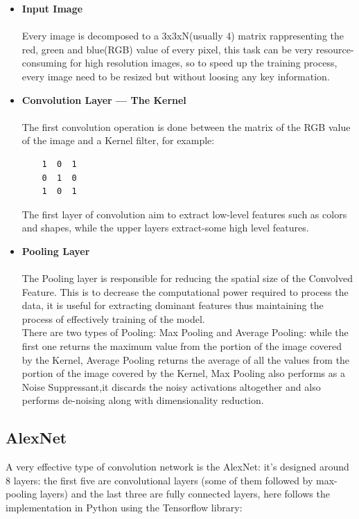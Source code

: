 \documentclass{article}
\begin{document}
\begin{itemize}
 \item \textbf{Input Image}\\\\
 	Every image is decomposed to a 3x3xN(usually 4) matrix rappresenting the red, green and blue(RGB) value of every pixel, this task can be very resource-consuming for high resolution images, so to speed up the training process, every image need to be resized but without loosing any key information.
	
	\item \textbf{Convolution Layer — The Kernel}\\\\
	The first convolution operation is done between the matrix of the RGB value of the image and a Kernel filter, for example:
	
	\begin{verbatim}
	1  0  1
	0  1  0
	1  0  1
	\end{verbatim}
	
	The first layer of convolution aim to extract low-level features such as colors and shapes, while the upper layers extract-some high level features.
	
	\item \textbf{Pooling Layer}\\\\
	The Pooling layer is responsible for reducing the spatial size of the Convolved Feature. This is to decrease the computational power required to process the data, it is useful for extracting dominant features 		 thus maintaining the process of effectively training of the model.\\
	There are two types of Pooling: Max Pooling and Average Pooling: while the first one returns the maximum value from the portion of the image covered by the Kernel, Average Pooling returns the 	average of all the values from the portion of the image covered by the Kernel,
	Max Pooling also performs as a Noise Suppressant,it discards the noisy activations altogether and also performs de-noising along with dimensionality reduction. 

	\end{itemize}
	
\subsection{AlexNet}
	
A very effective type of convolution network is the AlexNet: it's designed around 8 layers: the first five are convolutional layers (some of them followed by max-pooling layers) and the last three are fully connected layers, here follows the implementation in Python using the Tensorflow library:
\end{document}
